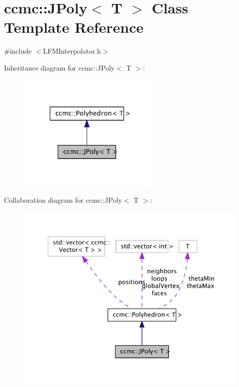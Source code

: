 \hypertarget{classccmc_1_1_j_poly}{\section{ccmc\-:\-:J\-Poly$<$ T $>$ Class Template Reference}
\label{classccmc_1_1_j_poly}
}


{\ttfamily \#include $<$L\-F\-M\-Interpolator.\-h$>$}



Inheritance diagram for ccmc\-:\-:J\-Poly$<$ T $>$\-:\nopagebreak
\begin{figure}[H]
\begin{center}
\leavevmode
\includegraphics[width=190pt]{classccmc_1_1_j_poly__inherit__graph}
\end{center}
\end{figure}


Collaboration diagram for ccmc\-:\-:J\-Poly$<$ T $>$\-:\nopagebreak
\begin{figure}[H]
\begin{center}
\leavevmode
\includegraphics[width=345pt]{classccmc_1_1_j_poly__coll__graph}
\end{center}
\end{figure}
